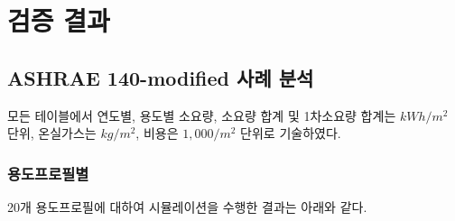\part{검증 결과}
\label{part:algorithm}


\chapter{ASHRAE 140-modified 사례 분석}
\label{chapter:ashrae140-modified}

모든 테이블에서 연도별, 용도별 소요량, 소요량 합계 및 1차소요량 합계는 $kWh/m^2$ 단위, 온실가스는 $ kg/m^2$, 비용은 $1,000/m^2$ 단위로 기술하였다.

\section{용도프로필별}
20개 용도프로필에 대하여 시뮬레이션을 수행한 결과는 아래와 같다. 

